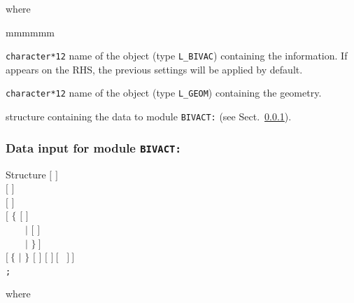 \goodbreak
\noindent where
\begin{ListeDeDescription}{mmmmmm}

\item[\dusa{TRACK}] {\tt character*12} name of the  object (type {\tt L\_BIVAC}) containing the  information. If  appears on the RHS, the previous settings will be applied by default.

\item[\dusa{GEOM}] {\tt character*12} name of the  object (type {\tt L\_GEOM}) containing the geometry.

\item[\dstr{bivact\_data}] structure containing the data to module {\tt BIVACT:} (see Sect.~\ref{sect:bivact_data}).

\end{ListeDeDescription}

\vskip 0.2cm

\subsubsection{Data input for module {\tt BIVACT:}}\label{sect:bivact_data}

\begin{DataStructure}{Structure }
$[$   $]$ \\
$[$   $]$ \\
$[$   $]$ \\
$[$ $\{$  $[$   $]$ \\
~~~~$|$  $[$   $]$ \\
~~~~$|$  $\}~]$ \\
$[~\{$  $|$  $\}$ $[$  $]$  $[$   $]~[$  ~$]~]$ \\
{\tt ;}
\end{DataStructure}

\noindent where

